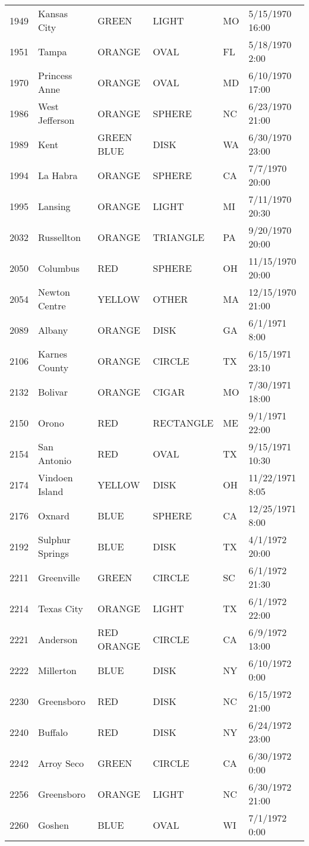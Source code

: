 \begin{tabular}{llllll}
1949 & Kansas City & GREEN & LIGHT & MO & 5/15/1970 16:00 \\
1951 & Tampa & ORANGE & OVAL & FL & 5/18/1970 2:00 \\
1970 & Princess Anne & ORANGE & OVAL & MD & 6/10/1970 17:00 \\
1986 & West Jefferson & ORANGE & SPHERE & NC & 6/23/1970 21:00 \\
1989 & Kent & GREEN BLUE & DISK & WA & 6/30/1970 23:00 \\
1994 & La Habra & ORANGE & SPHERE & CA & 7/7/1970 20:00 \\
1995 & Lansing & ORANGE & LIGHT & MI & 7/11/1970 20:30 \\
2032 & Russellton & ORANGE & TRIANGLE & PA & 9/20/1970 20:00 \\
2050 & Columbus & RED & SPHERE & OH & 11/15/1970 20:00 \\
2054 & Newton Centre & YELLOW & OTHER & MA & 12/15/1970 21:00 \\
2089 & Albany & ORANGE & DISK & GA & 6/1/1971 8:00 \\
2106 & Karnes County & ORANGE & CIRCLE & TX & 6/15/1971 23:10 \\
2132 & Bolivar & ORANGE & CIGAR & MO & 7/30/1971 18:00 \\
2150 & Orono & RED & RECTANGLE & ME & 9/1/1971 22:00 \\
2154 & San Antonio & RED & OVAL & TX & 9/15/1971 10:30 \\
2174 & Vindoen Island & YELLOW & DISK & OH & 11/22/1971 8:05 \\
2176 & Oxnard & BLUE & SPHERE & CA & 12/25/1971 8:00 \\
2192 & Sulphur Springs & BLUE & DISK & TX & 4/1/1972 20:00 \\
2211 & Greenville & GREEN & CIRCLE & SC & 6/1/1972 21:30 \\
2214 & Texas City & ORANGE & LIGHT & TX & 6/1/1972 22:00 \\
2221 & Anderson & RED ORANGE & CIRCLE & CA & 6/9/1972 13:00 \\
2222 & Millerton & BLUE & DISK & NY & 6/10/1972 0:00 \\
2230 & Greensboro & RED & DISK & NC & 6/15/1972 21:00 \\
2240 & Buffalo & RED & DISK & NY & 6/24/1972 23:00 \\
2242 & Arroy Seco & GREEN & CIRCLE & CA & 6/30/1972 0:00 \\
2256 & Greensboro & ORANGE & LIGHT & NC & 6/30/1972 21:00 \\
2260 & Goshen & BLUE & OVAL & WI & 7/1/1972 0:00 \\

\end{tabular}
